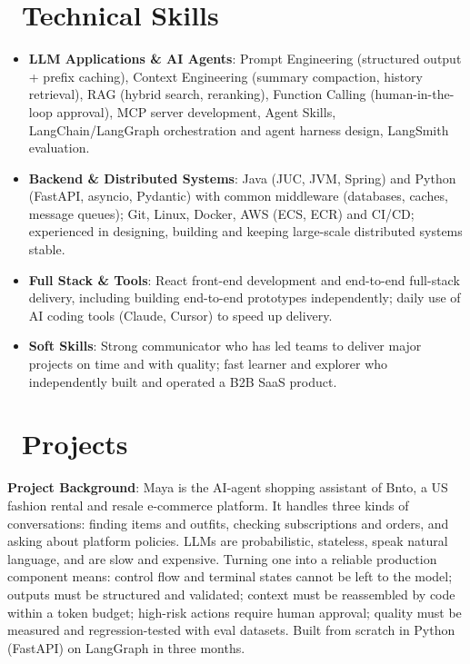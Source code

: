 \documentclass{resume}
\begin{document}
\section{\faCogs\ Technical Skills}
\begin{itemize}
    \item \textbf{LLM Applications \& AI Agents}: Prompt Engineering (structured output + prefix caching), Context Engineering (summary compaction, history retrieval), RAG (hybrid search, reranking), Function Calling (human-in-the-loop approval), MCP server development, Agent Skills, LangChain/LangGraph orchestration and agent harness design, LangSmith evaluation.
    \item \textbf{Backend \& Distributed Systems}: Java (JUC, JVM, Spring) and Python (FastAPI, asyncio, Pydantic) with common middleware (databases, caches, message queues); Git, Linux, Docker, AWS (ECS, ECR) and CI/CD; experienced in designing, building and keeping large-scale distributed systems stable.
    \item \textbf{Full Stack \& Tools}: React front-end development and end-to-end full-stack delivery, including building end-to-end prototypes independently; daily use of AI coding tools (Claude, Cursor) to speed up delivery.
    \item \textbf{Soft Skills}: Strong communicator who has led teams to deliver major projects on time and with quality; fast learner and explorer who independently built and operated a B2B SaaS product.
\end{itemize}

\section{\faInfo\ Projects}

\textbf{Project Background}: Maya is the AI-agent shopping assistant of Bnto, a US fashion rental and resale e-commerce platform. It handles three kinds of conversations: finding items and outfits, checking subscriptions and orders, and asking about platform policies. LLMs are probabilistic, stateless, speak natural language, and are slow and expensive. Turning one into a reliable production component means: control flow and terminal states cannot be left to the model; outputs must be structured and validated; context must be reassembled by code within a token budget; high-risk actions require human approval; quality must be measured and regression-tested with eval datasets. Built from scratch in Python (FastAPI) on LangGraph in three months.\\
\end{document}
